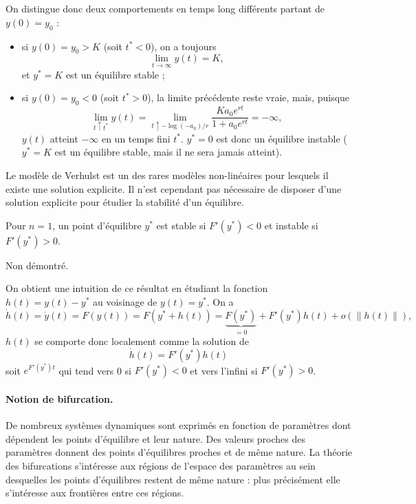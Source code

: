 \begin{description}
$$\begin{tabular}{cc}
\begin{tabular}{p{0.5\textwidth}}
    \end{tabular}
  \end{tabular}
  $$
  On distingue donc deux comportements en temps long différents partant de $y(0) = y_0$ : 
  \begin{itemize}
    \item si $y(0) = y_0 > K$ (soit $t^* < 0$), on a toujours
    $$
    \lim_{t \to \infty} y(t) = K,
    $$
    et $y^* = K$ est un équilibre stable ;
    \item si $y(0) = y_0 < 0$ (soit $t^* > 0$), la limite précédente reste vraie, mais, puisque
    $$
    \lim_{t \uparrow t^*} y(t) 
    = \lim_{t \uparrow -\log(-a_0) / r}  \frac{K a_0 e^{rt}}{1 +  a_0 e^{rt}}
    = -\infty,
    $$
    $y(t)$ atteint $- \infty$ en un temps fini $t^*$. $y^* = 0$ est donc un équilibre instable ($y^* = K$ est un équilibre stable, mais il ne sera jamais atteint).
  \end{itemize}
\end{description}

\remark
Le modèle de Verhulst est un des rares modèles non-linéaires pour lesquels il existe une solution explicite. Il n'est cependant pas nécessaire de disposer d'une solution explicite pour étudier la stabilité d'un équilibre.

\begin{theorem}[Stabilité ($n = 1$)]
  Pour $n=1$, un point d'équilibre $y^*$ est stable si $F'(y^*) < 0$ et instable si $F'(y^*) > 0$.
\end{theorem}

\proof Non démontré. \eproof

\remark
On obtient une intuition de ce résultat en étudiant la fonction $h(t) = y(t) - y^*$ au voisinage de $y(t) = y^*$. On a
$$
\dot h(t) = \dot y(t) = F(y(t)) = F(y^* + h(t)) = \underset{=0}{\underbrace{F(y^*)}} + F'(y^*) h(t) + o(\|h(t)\|),
$$
$h(t)$ se comporte donc localement comme la solution de 
$$
\dot h(t) = F'(y^*) h(t)
$$
soit $e ^{F'(y^*) t}$ qui tend vers 0 si $F'(y^*) < 0$ et vers l'infini si $F'(y^*) > 0$.


\paragraph*{Notion de bifurcation.}
De nombreux systèmes dynamiques sont exprimés en fonction de paramètres dont dépendent les points d'équilibre et leur nature. Des valeurs proches des paramètres donnent des points d'équilibres proches et de même nature. La théorie des bifurcations s'intéresse aux régions de l'espace des paramètres au sein desquelles les points d'équilibres restent de même nature : plus précisément elle s'intéresse aux frontières entre ces régions.

